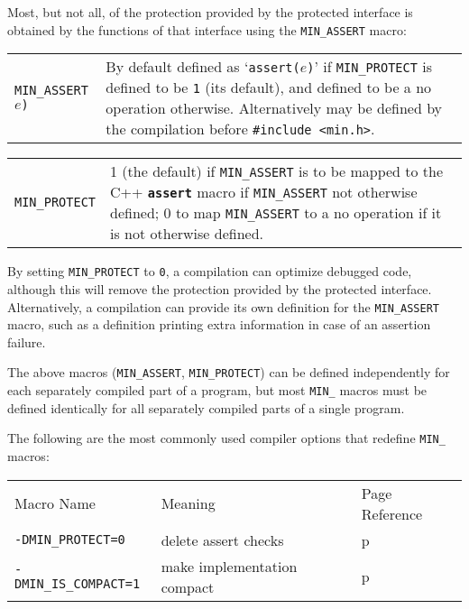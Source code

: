 \documentclass[12pt]{article}
\makeatletter
\newcommand{\ttkey}[1]{{\tt \bf #1}\index{#1@{\tt #1}}}
\newcommand{\ttnbkey}[1]{{\tt #1}\index{#1@{\tt #1}}}
\newcommand{\pagref}[1]{p\pageref{#1}}
\newenvironment{indpar}[1][0.3in]%
	{\begin{list}{}%
		     {\setlength{\itemsep}{0in}%
		      \setlength{\topsep}{0in}%
		      \setlength{\parsep}{1ex}%
		      \setlength{\labelwidth}{#1}%
		      \setlength{\leftmargin}{#1}%
		      \addtolength{\leftmargin}{\labelsep}}%
	 \item}%
	{\end{list}}
\newcommand{\LABEL}[1]{\label{#1}}
\newcommand{\TTNBKEY}[1]{\ttnbkey{#1}}
\makeatother
\begin{document}
Most, but not all, of the protection provided by the protected interface
is obtained by the functions of that interface using the
{\tt MIN\_ASSERT} macro:

\begin{indpar}
\begin{tabular}{lp{4.0in}}
\TTNBKEY{MIN\_ASSERT}{\tt (}$e${\tt )}
	& By default defined as `{\tt assert(}$e${\tt )}' if
	  {\tt MIN\_PROTECT} is defined to be {\tt 1} (its default),
	  and defined to be a no operation otherwise.  Alternatively
	  may be defined by the compilation before
	  \verb|#include <min.h>|.
\LABEL{MIN_ASSERT}
\end{tabular}
\end{indpar}
\begin{indpar}
\begin{tabular}{lp{4.0in}}
\TTNBKEY{MIN\_PROTECT}	& 1 (the default)
                          if {\tt MIN\_ASSERT} is to be mapped to
			  the C++ \ttkey{assert} macro if {\tt MIN\_ASSERT}
			  not otherwise defined; 0 to map {\tt MIN\_ASSERT}
			  to a no operation if it is not otherwise defined.
\LABEL{MIN_PROTECT} \\
\end{tabular}
\end{indpar}

By setting {\tt MIN\_PROTECT} to {\tt 0}, a compilation can optimize
debugged code, although this will remove the protection
provided by the protected interface.  Alternatively,
a compilation can provide its own definition for the
{\tt MIN\_ASSERT} macro,
such as a definition printing extra information
in case of an assertion failure.

The above macros ({\tt MIN\_ASSERT}, {\tt MIN\_PROTECT})
can be defined independently for each separately compiled
part of a program, but most \verb|MIN_| macros must be defined identically
for all separately compiled parts of a single program.

The following are the most commonly used compiler options that
redefine {\tt MIN\_} macros:

\begin{indpar}
\begin{tabular}{lll}
Macro Name		& Meaning	& Page Reference \\[1ex]
\verb|-DMIN_PROTECT=0|	& delete assert checks
					& \pagref{MIN_PROTECT} \\
\verb|-DMIN_IS_COMPACT=1|
			& make implementation compact
					& \pagref{MIN_IS_COMPACT} \\
\end{tabular}
\end{indpar}
\end{document}
